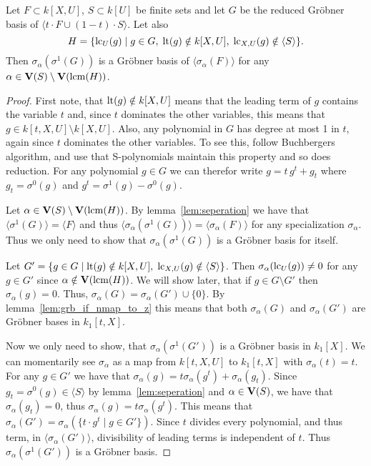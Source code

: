 \begin{lemma}\label{lem:grb_if_nmap_to_z_t}
  Let $F \subset k[X, U]$, $S \subset k[U]$ be finite sets %
  and let $G$ be the reduced Gröbner basis of $\langle t\cdot F \cup (1-t)\cdot S \rangle$. Let also \[H = \{\operatorname{lc}_{U}(g) \mid g \in G,\; \operatorname{lt}(g) \notin k[X, U],\; \operatorname{lc}_{X, U}(g) \notin \langle S \rangle\}.\] Then $\sigma_{\alpha}(\sigma^{1}(G))$ is a Gröbner basis of $\langle \sigma_{\alpha}(F) \rangle$ for any $\alpha \in \operatorname{\mathbf V}(S) \setminus \operatorname{\mathbf V}(\operatorname{lcm}(H))$.
\end{lemma}
\begin{proof}
  First note, that $\operatorname{lt}(g) \notin k[X, U]$ means that the leading term of $g$ contains the variable $t$ and, since $t$ dominates the other variables, this means that $g \in k[t, X, U] \setminus k[X, U]$. Also, any polynomial in $G$ has degree at most 1 in $t$, again since $t$ dominates the other variables. To see this, follow Buchbergers algorithm, and use that S-polynomials maintain this property and so does reduction. For any polynomial $g \in G$ we can therefor write $g = t\,g^{t} + g_{t}$ where $g_{t} = \sigma^{0}(g)$ and $g^{t} = \sigma^{1}(g) - \sigma^{0}(g)$.

  Let $\alpha \in \operatorname{\mathbf V}(S) \setminus \operatorname{\mathbf V}(\operatorname{lcm}(H))$. By lemma~\ref{lem:seperation} we have that $\langle \sigma^{1}(G) \rangle = \langle F \rangle$ and thus $\langle \sigma_{\alpha}(\sigma^{1}(G)) \rangle = \langle \sigma_{\alpha}(F) \rangle$ for any specialization $\sigma_{\alpha}$. Thus we only need to show that $\sigma_{\alpha}(\sigma^{1}(G))$ is a Gröbner basis for itself.

  Let $G' = \{g \in G \mid \operatorname{lt}(g) \notin k[X, U],\; \operatorname{lc}_{X, U}(g) \notin \langle S \rangle \}$. Then $\sigma_{\alpha}(\operatorname{lc}_{U}(g)) \neq 0$ for any $g \in G'$ since $\alpha \notin \operatorname{\mathbf V}(\operatorname{lcm}(H))$. We will show later, that if $g \in G \setminus G'$ then $\sigma_{\alpha}(g) = 0$. Thus, $\sigma_{\alpha}(G) = \sigma_{\alpha}(G') \cup \{0\}$. By lemma~\ref{lem:grb_if_nmap_to_z} this means that both $\sigma_{\alpha}(G)$ and $\sigma_{\alpha}(G')$ are Gröbner bases in $k_{1}[t, X]$.

  Now we only need to show, that $\sigma_{\alpha}(\sigma^{1}(G'))$ is a Gröbner basis in $k_{1}[X]$. We can momentarily see $\sigma_{\alpha}$ as a map from $k[t, X, U]$ to $k_{1}[t, X]$ with $\sigma_{\alpha}(t) = t$. For any $g \in G'$ we have that $\sigma_{\alpha}(g) = t \sigma_{\alpha}(g^{t}) + \sigma_{\alpha}(g_{t})$. Since $g_{t} = \sigma^{0}(g) \in \langle S \rangle$ by lemma~\ref{lem:seperation} and $\alpha \in \operatorname{\mathbf V}(S)$, we have that $\sigma_{\alpha}(g_{t}) = 0$, thus $\sigma_{\alpha}(g) = t \sigma_{\alpha}(g^{t})$. This means that $\sigma_{\alpha}(G') = \sigma_{\alpha}(\{t \cdot g^{t} \mid g \in G'\})$. Since $t$ divides every polynomial, and thus term, in $\langle \sigma_{\alpha}(G') \rangle$, divisibility of leading terms is independent of $t$. Thus $\sigma_{\alpha}(\sigma^{1}(G'))$ is a Gröbner basis.


\end{proof}
